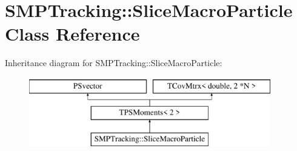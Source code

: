 \hypertarget{classSMPTracking_1_1SliceMacroParticle}{}\section{S\+M\+P\+Tracking\+:\+:Slice\+Macro\+Particle Class Reference}
\label{classSMPTracking_1_1SliceMacroParticle}
Inheritance diagram for S\+M\+P\+Tracking\+:\+:Slice\+Macro\+Particle\+:\begin{figure}[H]
\begin{center}
\leavevmode
\includegraphics[height=3.000000cm]{classSMPTracking_1_1SliceMacroParticle}
\end{center}
\end{figure}

